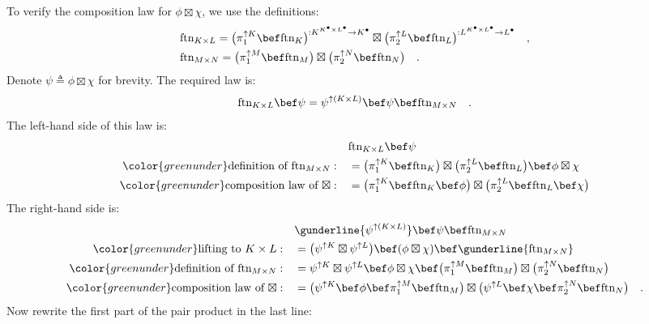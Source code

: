 To verify the composition law for $\phi\boxtimes\chi$, we use the
definitions:
\begin{align*}
 & \text{ftn}_{K\times L}=\big(\pi_{1}^{\uparrow K}\bef\text{ftn}_{K}\big)^{:K^{K^{\bullet}\times L^{\bullet}}\rightarrow K^{\bullet}}\boxtimes\big(\pi_{2}^{\uparrow L}\bef\text{ftn}_{L}\big)^{:L^{K^{\bullet}\times L^{\bullet}}\rightarrow L^{\bullet}}\quad,\\
 & \text{ftn}_{M\times N}=\big(\pi_{1}^{\uparrow M}\bef\text{ftn}_{M}\big)\boxtimes\big(\pi_{2}^{\uparrow N}\bef\text{ftn}_{N}\big)\quad.
\end{align*}
Denote $\psi\triangleq\phi\boxtimes\chi$ for brevity. The required
law is:
\[
\text{ftn}_{K\times L}\bef\psi=\psi^{\uparrow(K\times L)}\bef\psi\bef\text{ftn}_{M\times N}\quad.
\]
The left-hand side of this law is:
\begin{align*}
 & \text{ftn}_{K\times L}\bef\psi\\
{\color{greenunder}\text{definition of }\text{ftn}_{M\times N}:}\quad & =\big(\pi_{1}^{\uparrow K}\bef\text{ftn}_{K}\big)\boxtimes\big(\pi_{2}^{\uparrow L}\bef\text{ftn}_{L}\big)\bef\phi\boxtimes\chi\\
{\color{greenunder}\text{composition law of }\boxtimes:}\quad & =\big(\pi_{1}^{\uparrow K}\bef\text{ftn}_{K}\bef\phi\big)\boxtimes\big(\pi_{2}^{\uparrow L}\bef\text{ftn}_{L}\bef\chi\big)
\end{align*}
The right-hand side is:
\begin{align*}
 & \gunderline{\psi^{\uparrow(K\times L)}}\bef\psi\bef\text{ftn}_{M\times N}\\
{\color{greenunder}\text{lifting to }K\times L:}\quad & =\big(\psi^{\uparrow K}\boxtimes\psi^{\uparrow L}\big)\bef(\phi\boxtimes\chi)\bef\gunderline{\text{ftn}_{M\times N}}\\
{\color{greenunder}\text{definition of }\text{ftn}_{M\times N}:}\quad & =\psi^{\uparrow K}\boxtimes\psi^{\uparrow L}\bef\phi\boxtimes\chi\bef\big(\pi_{1}^{\uparrow M}\bef\text{ftn}_{M}\big)\boxtimes\big(\pi_{2}^{\uparrow N}\bef\text{ftn}_{N}\big)\\
{\color{greenunder}\text{composition law of }\boxtimes:}\quad & =\big(\psi^{\uparrow K}\bef\phi\bef\pi_{1}^{\uparrow M}\bef\text{ftn}_{M}\big)\boxtimes\big(\psi^{\uparrow L}\bef\chi\bef\pi_{2}^{\uparrow N}\bef\text{ftn}_{N}\big)\quad.
\end{align*}
Now rewrite the first part of the pair product in the last line:
